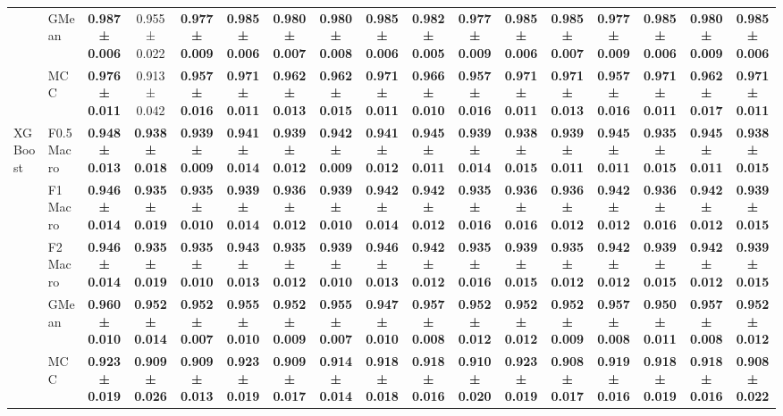\begin{table}[H]
{\begin{tabular}{llccccccccccccccc}
 & GMean & \textbf{0.987 ± 0.006} & 0.955 ± 0.022 & \textbf{0.977 ± 0.009} & \textbf{0.985 ± 0.006} & \textbf{0.980 ± 0.007} & \textbf{0.980 ± 0.008} & \textbf{0.985 ± 0.006} & \textbf{0.982 ± 0.005} & \textbf{0.977 ± 0.009} & \textbf{0.985 ± 0.006} & \textbf{0.985 ± 0.007} & \textbf{0.977 ± 0.009} & \textbf{0.985 ± 0.006} & \textbf{0.980 ± 0.009} & \textbf{0.985 ± 0.006} \\
 & MCC & \textbf{0.976 ± 0.011} & 0.913 ± 0.042 & \textbf{0.957 ± 0.016} & \textbf{0.971 ± 0.011} & \textbf{0.962 ± 0.013} & \textbf{0.962 ± 0.015} & \textbf{0.971 ± 0.011} & \textbf{0.966 ± 0.010} & \textbf{0.957 ± 0.016} & \textbf{0.971 ± 0.011} & \textbf{0.971 ± 0.013} & \textbf{0.957 ± 0.016} & \textbf{0.971 ± 0.011} & \textbf{0.962 ± 0.017} & \textbf{0.971 ± 0.011} \\
\cline{1-17}
\multirow[t]{5}{*}{XGBoost} & F0.5 Macro & \textbf{0.948 ± 0.013} & \textbf{0.938 ± 0.018} & \textbf{0.939 ± 0.009} & \textbf{0.941 ± 0.014} & \textbf{0.939 ± 0.012} & \textbf{0.942 ± 0.009} & \textbf{0.941 ± 0.012} & \textbf{0.945 ± 0.011} & \textbf{0.939 ± 0.014} & \textbf{0.938 ± 0.015} & \textbf{0.939 ± 0.011} & \textbf{0.945 ± 0.011} & \textbf{0.935 ± 0.015} & \textbf{0.945 ± 0.011} & \textbf{0.938 ± 0.015} \\
 & F1 Macro & \textbf{0.946 ± 0.014} & \textbf{0.935 ± 0.019} & \textbf{0.935 ± 0.010} & \textbf{0.939 ± 0.014} & \textbf{0.936 ± 0.012} & \textbf{0.939 ± 0.010} & \textbf{0.942 ± 0.014} & \textbf{0.942 ± 0.012} & \textbf{0.935 ± 0.016} & \textbf{0.936 ± 0.016} & \textbf{0.936 ± 0.012} & \textbf{0.942 ± 0.012} & \textbf{0.936 ± 0.016} & \textbf{0.942 ± 0.012} & \textbf{0.939 ± 0.015} \\
 & F2 Macro & \textbf{0.946 ± 0.014} & \textbf{0.935 ± 0.019} & \textbf{0.935 ± 0.010} & \textbf{0.943 ± 0.013} & \textbf{0.935 ± 0.012} & \textbf{0.939 ± 0.010} & \textbf{0.946 ± 0.013} & \textbf{0.942 ± 0.012} & \textbf{0.935 ± 0.016} & \textbf{0.939 ± 0.015} & \textbf{0.935 ± 0.012} & \textbf{0.942 ± 0.012} & \textbf{0.939 ± 0.015} & \textbf{0.942 ± 0.012} & \textbf{0.939 ± 0.015} \\
 & GMean & \textbf{0.960 ± 0.010} & \textbf{0.952 ± 0.014} & \textbf{0.952 ± 0.007} & \textbf{0.955 ± 0.010} & \textbf{0.952 ± 0.009} & \textbf{0.955 ± 0.007} & \textbf{0.947 ± 0.010} & \textbf{0.957 ± 0.008} & \textbf{0.952 ± 0.012} & \textbf{0.952 ± 0.012} & \textbf{0.952 ± 0.009} & \textbf{0.957 ± 0.008} & \textbf{0.950 ± 0.011} & \textbf{0.957 ± 0.008} & \textbf{0.952 ± 0.012} \\
 & MCC & \textbf{0.923 ± 0.019} & \textbf{0.909 ± 0.026} & \textbf{0.909 ± 0.013} & \textbf{0.923 ± 0.019} & \textbf{0.909 ± 0.017} & \textbf{0.914 ± 0.014} & \textbf{0.918 ± 0.018} & \textbf{0.918 ± 0.016} & \textbf{0.910 ± 0.020} & \textbf{0.923 ± 0.019} & \textbf{0.908 ± 0.017} & \textbf{0.919 ± 0.016} & \textbf{0.918 ± 0.019} & \textbf{0.918 ± 0.016} & \textbf{0.908 ± 0.022} \\
\cline{1-17}
\bottomrule
\end{tabular}
    }
\end{table}
